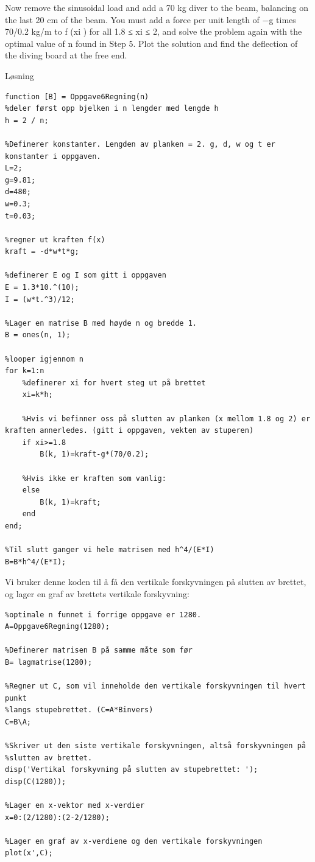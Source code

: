 
%
Now remove the sinusoidal load and add a 70 kg diver to the beam, balancing on the last 20 cm of the beam. You must add a force per unit length of −g times 70/0.2 kg/m to f (xi ) for all 1.8 ≤ xi ≤ 2, and solve the problem again with the optimal value of n found in Step 5. Plot the solution and find the deflection of the diving board at the free end.

\vspace{5mm}
Løsning

\begin{lstlisting}[caption={Oppgave6regning.m}]
function [B] = Oppgave6Regning(n)
%deler først opp bjelken i n lengder med lengde h 
h = 2 / n;        

%Definerer konstanter. Lengden av planken = 2. g, d, w og t er konstanter i oppgaven. 
L=2;
g=9.81; 
d=480; 
w=0.3;
t=0.03; 

%regner ut kraften f(x) 
kraft = -d*w*t*g; 

%definerer E og I som gitt i oppgaven
E = 1.3*10.^(10); 
I = (w*t.^3)/12; 

%Lager en matrise B med høyde n og bredde 1. 
B = ones(n, 1);

%looper igjennom n
for k=1:n
	%definerer xi for hvert steg ut på brettet
    xi=k*h; 

    %Hvis vi befinner oss på slutten av planken (x mellom 1.8 og 2) er kraften annerledes. (gitt i oppgaven, vekten av stuperen)
    if xi>=1.8
        B(k, 1)=kraft-g*(70/0.2);

    %Hvis ikke er kraften som vanlig:
    else
        B(k, 1)=kraft;
    end
end;

%Til slutt ganger vi hele matrisen med h^4/(E*I)
B=B*h^4/(E*I);
\end{lstlisting}

Vi bruker denne koden til å få den vertikale forskyvningen på slutten av brettet, og lager en graf av brettets vertikale forskyvning:\\

\begin{lstlisting}[caption={Oppgave6.m}]
%Regner matrisen A med alle vertikale forskyvninger langs stupebrettet. Den
%optimale n funnet i forrige oppgave er 1280.
A=Oppgave6Regning(1280); 

%Definerer matrisen B på samme måte som før
B= lagmatrise(1280); 

%Regner ut C, som vil inneholde den vertikale forskyvningen til hvert punkt
%langs stupebrettet. (C=A*Binvers)
C=B\A; 

%Skriver ut den siste vertikale forskyvningen, altså forskyvningen på
%slutten av brettet. 
disp('Vertikal forskyvning på slutten av stupebrettet: '); 
disp(C(1280)); 

%Lager en x-vektor med x-verdier
x=0:(2/1280):(2-2/1280); 

%Lager en graf av x-verdiene og den vertikale forskyvningen
plot(x',C);
\end{lstlisting} 

